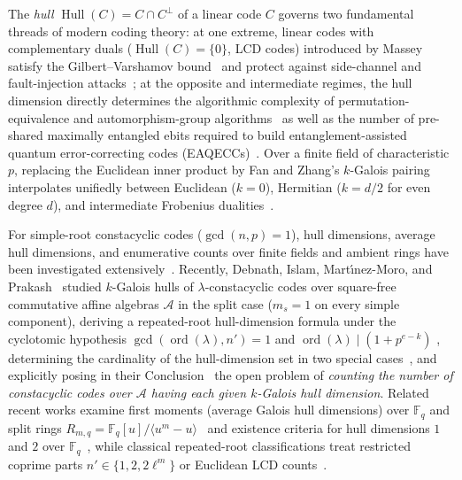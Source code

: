 \documentclass[preprint,12pt]{elsarticle}
\newcommand{\F}{\mathbb F}
\newcommand{\A}{\mathcal A}
\newcommand{\Hull}{\operatorname{Hull}}
\newcommand{\ord}{\operatorname{ord}}
\numberwithin{equation}{section}
\theoremstyle{plain}
\theoremstyle{definition}
\theoremstyle{remark}
\begin{document}
The \emph{hull} $\Hull(C)=C\cap C^\perp$ of a linear code $C$ governs two
fundamental threads of modern coding theory: at one extreme, linear codes with
complementary duals ($\Hull(C)=\{0\}$, LCD codes) introduced by
Massey~\cite{massey1992,yangMassey1994} satisfy the Gilbert--Varshamov
bound~\cite{sendrier2004} and protect against side-channel and fault-injection
attacks~\cite{huffmanPless2003}; at the opposite and intermediate regimes, the
hull dimension directly determines the algorithmic complexity of
permutation-equivalence and automorphism-group algorithms~\cite{sendrier1997,bouyuklieva2026}
as well as the number of pre-shared maximally entangled ebits required to build
entanglement-assisted quantum error-correcting codes
(EAQECCs)~\cite{brun2006,wildeBrun2008,guendaJitmanGulliver2018,cao2021}.
Over a finite field of characteristic $p$, replacing the Euclidean inner product
by Fan and Zhang's $k$-Galois pairing~\cite{fanZhang2017} interpolates unifiedly
between Euclidean ($k=0$), Hermitian ($k=d/2$ for even degree $d$), and intermediate
Frobenius dualities~\cite{liuPan2020,fuLiu2022}.

For simple-root constacyclic codes ($\gcd(n,p)=1$), hull dimensions, average hull
dimensions, and enumerative counts over finite fields and ambient rings have been
investigated extensively~\cite{skersys2003,sangwisut2015,jitmanSangwisut2018,jitmanZ4,talbi2022,debnathConstacyclic2023,debnathCorrection2023,pathakZ4,gao2023,zhang2026,eldinSole2026,eldinLeroy2026,aliabadi2026}.
Recently, Debnath, Islam, Mart\'{\i}nez-Moro, and Prakash~\cite{debnathAffine2026}
studied $k$-Galois hulls of $\lambda$-constacyclic codes over square-free
commutative affine algebras $\A$ in the split case ($m_s=1$ on every simple
component), deriving a repeated-root hull-dimension formula under the cyclotomic
hypothesis $\gcd(\ord(\lambda),n')=1$ and $\ord(\lambda)\mid(1+p^{e-k})$
\cite[Theorem~8]{debnathAffine2026}, determining the cardinality of the hull-dimension
set in two special cases~\cite[Corollary~3.5]{debnathAffine2026}, and explicitly
posing in their Conclusion~\cite[p.~23]{debnathAffine2026} the open problem of
\emph{counting the number of constacyclic codes over $\A$ having each given
$k$-Galois hull dimension}. Related recent works examine first moments (average
Galois hull dimensions) over $\F_q$ and split rings $R_{m,q}=\F_q[u]/\langle
u^m-u\rangle$~\cite{debnathAverage2025} and existence criteria for hull dimensions
$1$ and $2$ over $\F_q$~\cite{debnathSmall2026}, while classical repeated-root
classifications treat restricted coprime parts $n'\in\{1,2,2\ell^m\}$ or Euclidean
LCD counts~\cite{castagnoli1991,vanLint1991,dinhLopezPermouth2004,dinh2010,dinh2012,chenDinhLiu2015,pangZhuLi2018}.
\end{document}
